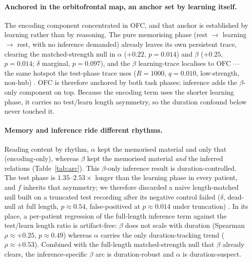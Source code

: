 \documentclass[11pt]{article}
\newcommand{\tab}[1]{Table~\ref{#1}}
\begin{document}
\paragraph{Anchored in the orbitofrontal map, an anchor set by learning itself.}
The encoding component concentrated in OFC, and that anchor is established by
learning rather than by reasoning. The pure memorising phase
(rest $\rightarrow$ learning $\rightarrow$ rest, with no inference demanded)
already leaves its own persistent trace, clearing the matched-strength null in
$\alpha$ ($+0.22$, $p=0.014$) and $\beta$ ($+0.25$, $p=0.014$; $\delta$ marginal,
$p=0.097$), and the $\beta$ learning-trace localises to OFC --- the same hotspot
the test-phase trace uses ($R=1000$, $q=0.010$, low-strength, non-hub)
. OFC is therefore anchored by both task phases; inference adds the $\beta$-only
component on top. Because the encoding term uses the shorter learning phase, it
carries no test/learn length asymmetry, so the duration confound below never
touched it.

\paragraph{Memory and inference ride different rhythms.}
Reading content by rhythm, $\alpha$ kept the memorised material and only that
(encoding-only), whereas $\beta$ kept the memorised material \emph{and} the
inferred relations (\tab{tab:arc}). This $\beta$-only inference result is
duration-controlled. The test phase is $1.35$--$2.53\times$ longer than the
learning phase in every patient, and $f$ inherits that asymmetry; we therefore
discarded a naive length-matched null built on a truncated test recording after
its negative control failed ($\delta$, dead-null at full length, $p\approx0.54$,
false-positived at $p\approx0.014$ under truncation)
. In its place, a per-patient regression of the full-length inference term
against the test/learn length ratio is artifact-free: $\beta$ does not scale with
duration (Spearman $\rho\approx+0.25$, $p\approx0.49$) whereas $\alpha$ carries
the only duration-tracking trend ($\rho\approx+0.53$). Combined with the
full-length matched-strength null that $\beta$ already clears, the
inference-specific $\beta$ arc is duration-robust and $\alpha$ is
duration-suspect.
\end{document}
